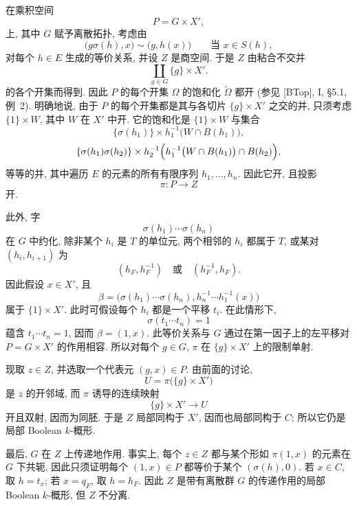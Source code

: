 在乘积空间
\[
  P=G\times X',
\]
上, 其中 \(G\) 赋予离散拓扑, 考虑由
\[
  \bigl(g\sigma(h),x\bigr)\sim\bigl(g,h(x)\bigr)
  \qquad\text{当 }x\in S(h),
\]
对每个 \(h\in E\) 生成的等价关系, 并设 \(Z\) 是商空间.
于是 \(Z\) 由粘合不交并
\[
  \coprod_{g\in G}\{g\}\times X'.
\]
的各个开集而得到. 因此 \(P\) 的每个开集 \(\Omega\)
的饱和化 \(\widetilde\Omega\) 都开
(参见 [BTop], I, \S5.1, 例~2).
明确地说, 由于 \(P\) 的每个开集都是其与各切片
\(\{g\}\times X'\) 之交的并, 只须考虑
\(\{1\}\times W\), 其中 \(W\) 在 \(X'\) 中开.
它的饱和化是 \(\{1\}\times W\) 与集合
\[
  \{\sigma(h_1)\}\times
  h_1^{-1}\bigl(W\cap B(h_1)\bigr),
\]
\[
  \{\sigma(h_1)\sigma(h_2)\}\times
  h_2^{-1}\Bigl(
    h_1^{-1}\bigl(W\cap B(h_1)\bigr)\cap B(h_2)
  \Bigr),
\]
等等的并, 其中遍历 \(E\) 的元素的所有有限序列 \(h_1,\ldots,h_n\).
因此它开, 且投影
\[
  \pi:P\longrightarrow Z
\]
开.

此外, 字
\[
  \sigma(h_1)\cdots\sigma(h_n)
\]
在 \(G\) 中约化, 除非某个 \(h_i\) 是 \(T\) 的单位元,
两个相邻的 \(h_i\) 都属于 \(T\), 或某对 \((h_i,h_{i+1})\) 为
\[
  (h_F,h_F^{-1})
  \quad\text{或}\quad
  (h_F^{-1},h_F).
\]
因此假设 \(x\in X'\), 且
\[
  \beta=
  \bigl(
    \sigma(h_1)\cdots\sigma(h_n),
    h_n^{-1}\cdots h_1^{-1}(x)
  \bigr)
\]
属于 \(\{1\}\times X'\). 此时可假设每个 \(h_i\) 都是一个平移 \(t_i\).
在此情形下,
\[
  \sigma(t_1\cdots t_n)=1
\]
蕴含 \(t_1\cdots t_n=1\), 因而 \(\beta=(1,x)\).
此等价关系与 \(G\) 通过在第一因子上的左平移对 \(P=G\times X'\)
的作用相容. 所以对每个 \(g\in G\),
\(\pi\) 在 \(\{g\}\times X'\) 上的限制单射.

现取 \(z\in Z\), 并选取一个代表元 \((g,x)\in P\).
由前面的讨论,
\[
  U=\pi\bigl(\{g\}\times X'\bigr)
\]
是 \(z\) 的开邻域, 而 \(\pi\) 诱导的连续映射
\[
  \{g\}\times X'\longrightarrow U
\]
开且双射, 因而为同胚.
于是 \(Z\) 局部同构于 \(X'\), 因而也局部同构于 \(C\);
所以它仍是局部 Boolean \(k\)-概形.

最后, \(G\) 在 \(Z\) 上传递地作用.
事实上, 每个 \(z\in Z\) 都与某个形如 \(\pi(1,x)\)
的元素在 \(G\) 下共轭, 因此只须证明每个 \((1,x)\in P\)
都等价于某个 \((\sigma(h),0)\).
若 \(x\in C\), 取 \(h=t_x\); 若 \(x=q_F\), 取 \(h=h_F\).
因此 \(Z\) 是带有离散群 \(G\) 的传递作用的局部 Boolean \(k\)-概形,
但 \(Z\) 不分离.

